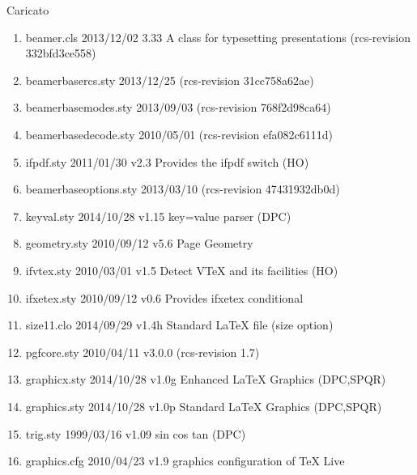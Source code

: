Caricato 
\begin{enumerate}
\item beamer.cls 2013/12/02 3.33 A class for typesetting presentations (rcs-revision 332bfd3ce558)
\item beamerbasercs.sty 2013/12/25 (rcs-revision 31cc758a62ae)
\item beamerbasemodes.sty 2013/09/03 (rcs-revision 768f2d98ca64)
\item beamerbasedecode.sty 2010/05/01 (rcs-revision efa082c6111d)
\item ifpdf.sty 2011/01/30 v2.3 Provides the ifpdf switch (HO)
\item beamerbaseoptions.sty 2013/03/10 (rcs-revision 47431932db0d)
\item keyval.sty 2014/10/28 v1.15 key=value parser (DPC)
\item geometry.sty 2010/09/12 v5.6 Page Geometry
\item ifvtex.sty 2010/03/01 v1.5 Detect VTeX and its facilities (HO)
\item ifxetex.sty 2010/09/12 v0.6 Provides ifxetex conditional
\item size11.clo 2014/09/29 v1.4h Standard LaTeX file (size option)
\item pgfcore.sty 2010/04/11 v3.0.0 (rcs-revision 1.7)
\item graphicx.sty 2014/10/28 v1.0g Enhanced LaTeX Graphics (DPC,SPQR)
\item graphics.sty 2014/10/28 v1.0p Standard LaTeX Graphics (DPC,SPQR)
\item trig.sty 1999/03/16 v1.09 sin cos tan (DPC)
\item graphics.cfg 2010/04/23 v1.9 graphics configuration of TeX Live

\end{enumerate}

